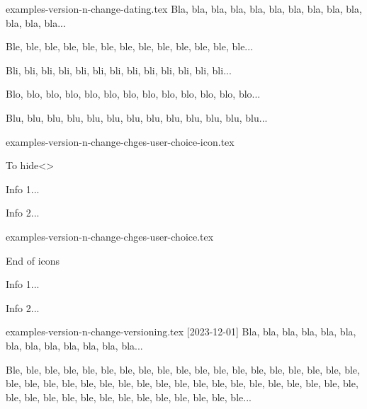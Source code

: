 \begin{filecontents*}[overwrite]{examples-version-n-change-dating.tex}
Bla, bla, bla, bla, bla, bla, bla, bla, bla, bla, bla, bla, bla...

\medskip %

Ble, ble, ble, ble, ble, ble, ble, ble, ble, ble, ble, ble, ble...

\medskip %

Bli, bli, bli, bli, bli, bli, bli, bli, bli, bli, bli, bli, bli...

Blo, blo, blo, blo, blo, blo, blo, blo, blo, blo, blo, blo, blo...

Blu, blu, blu, blu, blu, blu, blu, blu, blu, blu, blu, blu, blu...
\end{filecontents*}


\begin{filecontents*}[overwrite]{examples-version-n-change-chges-user-choice-icon.tex}
\begin{tdoctopic}{To hide}<\faEyeSlash>
    \item Info 1...
    \item Info 2...
\end{tdoctopic}
\end{filecontents*}


\begin{filecontents*}[overwrite]{examples-version-n-change-chges-user-choice.tex}
\begin{tdoctopic}{End of icons}
    \item Info 1...
    \item Info 2...
\end{tdoctopic}
\end{filecontents*}


\begin{filecontents*}[overwrite]{examples-version-n-change-versioning.tex}
[2023-12-01]
Bla, bla, bla, bla, bla, bla, bla, bla, bla, bla, bla, bla, bla...

\bigskip %

Ble, ble, ble, ble, ble, ble, ble, ble, ble, ble, ble, ble, ble,
ble, ble, ble, ble, ble, ble, ble, ble, ble, ble, ble, ble, ble,
ble, ble, ble, ble, ble, ble, ble, ble, ble, ble, ble, ble, ble,
ble, ble, ble, ble, ble, ble, ble, ble, ble, ble, ble, ble...
\end{filecontents*}


